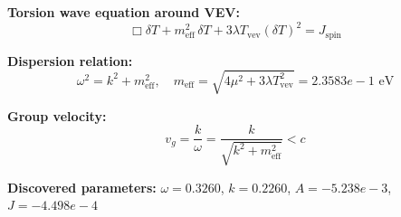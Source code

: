
\textbf{Torsion wave equation around VEV:}
\begin{equation}
  \Box \delta T + m_{\text{eff}}^2 \, \delta T + 3\lambda T_{\text{vev}} (\delta T)^2 = J_{\text{spin}}
\end{equation}

\textbf{Dispersion relation:}
\begin{equation}
  \omega^2 = k^2 + m_{\text{eff}}^2, \quad
  m_{\text{eff}} = \sqrt{4\mu^2 + 3\lambda T_{\text{vev}}^2} = 2.3583e-1 \text{ eV}
\end{equation}

\textbf{Group velocity:}
\begin{equation}
  v_g = \frac{k}{\omega} = \frac{k}{\sqrt{k^2 + m_{\text{eff}}^2}} < c
\end{equation}

\textbf{Discovered parameters:}
$\omega = 0.3260$, \quad
$k = 0.2260$, \quad
$A = -5.238e-3$, \quad
$J = -4.498e-4$